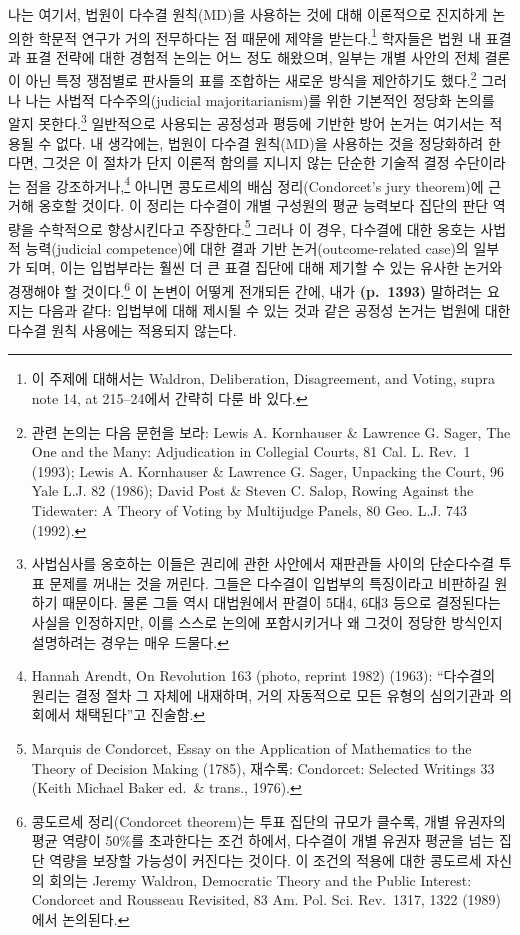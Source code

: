 \documentclass[a4paper,12pt,oneside]{article}  %
\begin{document}
나는 여기서, 법원이 다수결 원칙(MD)을 사용하는 것에 대해 이론적으로
진지하게 논의한 학문적 연구가 거의 전무하다는 점 때문에 제약을
받는다.\footnote{이 주제에 대해서는 Waldron, Deliberation, Disagreement,
  and Voting, supra note 14, at 215--24에서 간략히 다룬 바 있다.}
학자들은 법원 내 표결과 표결 전략에 대한 경험적 논의는 어느 정도
해왔으며, 일부는 개별 사안의 전체 결론이 아닌 특정 쟁점별로 판사들의
표를 조합하는 새로운 방식을 제안하기도 했다.\footnote{관련 논의는 다음
  문헌을 보라: Lewis A. Kornhauser \& Lawrence G. Sager, The One and the
  Many: Adjudication in Collegial Courts, 81 Cal. L. Rev.~1 (1993);
  Lewis A. Kornhauser \& Lawrence G. Sager, Unpacking the Court, 96 Yale
  L.J. 82 (1986); David Post \& Steven C. Salop, Rowing Against the
  Tidewater: A Theory of Voting by Multijudge Panels, 80 Geo. L.J. 743
  (1992).} 그러나 나는 사법적 다수주의(judicial majoritarianism)를 위한
기본적인 정당화 논의를 알지 못한다.\footnote{사법심사를 옹호하는 이들은
  권리에 관한 사안에서 재판관들 사이의 단순다수결 투표 문제를 꺼내는
  것을 꺼린다. 그들은 다수결이 입법부의 특징이라고 비판하길 원하기
  때문이다. 물론 그들 역시 대법원에서 판결이 5대4, 6대3 등으로
  결정된다는 사실을 인정하지만, 이를 스스로 논의에 포함시키거나 왜
  그것이 정당한 방식인지 설명하려는 경우는 매우 드물다.} 일반적으로
사용되는 공정성과 평등에 기반한 방어 논거는 여기서는 적용될 수 없다. 내
생각에는, 법원이 다수결 원칙(MD)을 사용하는 것을 정당화하려 한다면,
그것은 이 절차가 단지 이론적 함의를 지니지 않는 단순한 기술적 결정
수단이라는 점을 강조하거나,\footnote{Hannah Arendt, On Revolution 163
  (photo, reprint 1982) (1963): ``다수결의 원리는 결정 절차 그 자체에
  내재하며, 거의 자동적으로 모든 유형의 심의기관과 의회에서 채택된다''고
  진술함.} 아니면 콩도르세의 배심 정리(Condorcet's jury theorem)에
근거해 옹호할 것이다. 이 정리는 다수결이 개별 구성원의 평균 능력보다
집단의 판단 역량을 수학적으로 향상시킨다고 주장한다.\footnote{Marquis de
  Condorcet, Essay on the Application of Mathematics to the Theory of
  Decision Making (1785), 재수록: Condorcet: Selected Writings 33 (Keith
  Michael Baker ed.~\& trans., 1976).} 그러나 이 경우, 다수결에 대한
옹호는 사법적 능력(judicial competence)에 대한 결과 기반
논거(outcome-related case)의 일부가 되며, 이는 입법부라는 훨씬 더 큰
표결 집단에 대해 제기할 수 있는 유사한 논거와 경쟁해야 할
것이다.\footnote{콩도르세 정리(Condorcet theorem)는 투표 집단의 규모가
  클수록, 개별 유권자의 평균 역량이 50\%를 초과한다는 조건 하에서,
  다수결이 개별 유권자 평균을 넘는 집단 역량을 보장할 가능성이 커진다는
  것이다. 이 조건의 적용에 대한 콩도르세 자신의 회의는 Jeremy Waldron,
  Democratic Theory and the Public Interest: Condorcet and Rousseau
  Revisited, 83 Am. Pol. Sci. Rev.~1317, 1322 (1989)에서 논의된다.} 이
논변이 어떻게 전개되든 간에, 내가 \textbf{(p.~1393)} 말하려는 요지는
다음과 같다: 입법부에 대해 제시될 수 있는 것과 같은 공정성 논거는 법원에
대한 다수결 원칙 사용에는 적용되지 않는다.
\end{document}
